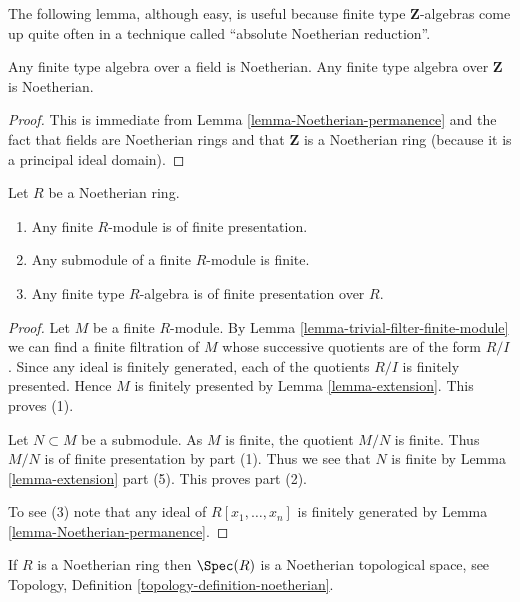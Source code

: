 \noindent
The following lemma, although easy, is useful because
finite type $\mathbf{Z}$-algebras come up quite often in
a technique called ``absolute Noetherian reduction''.

\begin{lemma}
\label{lemma-obvious-Noetherian}
Any finite type algebra over a field is Noetherian.
Any finite type algebra over $\mathbf{Z}$ is Noetherian.
\end{lemma}

\begin{proof}
This is immediate from Lemma \ref{lemma-Noetherian-permanence}
and the fact that fields are Noetherian rings and that
$\mathbf{Z}$ is a Noetherian ring (because it is a
principal ideal domain).
\end{proof}

\begin{lemma}
\label{lemma-Noetherian-finite-type-is-finite-presentation}
Let $R$ be a Noetherian ring.
\begin{enumerate}
\item Any finite $R$-module is of finite presentation.
\item Any submodule of a finite $R$-module is finite.
\item Any finite type $R$-algebra is of finite presentation over $R$.
\end{enumerate}
\end{lemma}

\begin{proof}
Let $M$ be a finite $R$-module. By
Lemma \ref{lemma-trivial-filter-finite-module}
we can find a finite filtration of $M$ whose successive quotients are
of the form $R/I$. Since any ideal is finitely generated, each of
the quotients $R/I$ is finitely presented. Hence $M$ is finitely
presented by
Lemma \ref{lemma-extension}.
This proves (1).

\medskip\noindent
Let $N \subset M$ be a submodule. As $M$ is finite, the quotient
$M/N$ is finite. Thus $M/N$ is of finite presentation by part (1).
Thus we see that $N$ is finite by Lemma \ref{lemma-extension} part (5).
This proves part (2).

\medskip\noindent
To see (3) note that any ideal of
$R[x_1, \ldots, x_n]$ is finitely generated by
Lemma \ref{lemma-Noetherian-permanence}.
\end{proof}

\begin{lemma}
\label{lemma-Noetherian-topology}
If $R$ is a Noetherian ring then $\Spec(R)$
is a Noetherian topological space, see Topology,
Definition \ref{topology-definition-noetherian}.
\end{lemma}

